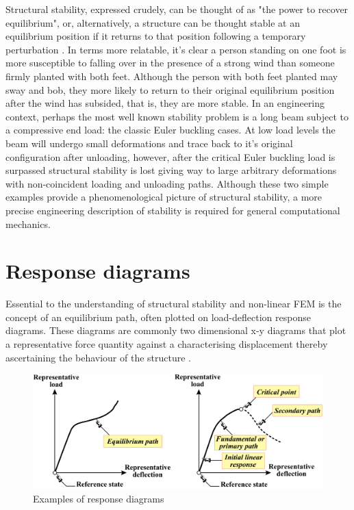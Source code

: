 Structural stability, expressed crudely, can be thought of as "the power to recover equilibrium", or, alternatively, a structure can be thought stable at an equilibrium position if it returns to that position following a temporary perturbation \cite{FelippaStabilityBasics2016}. In terms more relatable, it's clear a person standing on one foot is more susceptible to falling over in the presence of a strong wind than someone firmly planted with both feet. Although the person with both feet planted may sway and bob, they more likely to return to their original equilibrium position after the wind has subsided, that is, they are more stable. In an engineering context, perhaps the most well known stability problem is a long beam subject to a compressive end load: the classic Euler buckling cases. At low load levels the beam will undergo small deformations and trace back to it's original configuration after unloading, however, after the critical Euler buckling load is surpassed structural stability is lost giving way to large arbitrary deformations with non-coincident loading and unloading paths. Although these two simple examples provide a phenomenological picture of structural stability, a more precise engineering description of stability is required for general computational mechanics.

\section{Response diagrams}
Essential to the understanding of structural stability and non-linear FEM is the concept of an equilibrium path, often plotted on load-deflection response diagrams. These diagrams are commonly two dimensional x-y diagrams that plot a representative force quantity against a characterising displacement thereby ascertaining the behaviour of the structure \cite{FelippaNFEMTour2016}.

\begin{figure}[H]
	\centering
	\def\svgwidth{\columnwidth}
	\includegraphics[width=12cm]{images/stability_response_diagram.png}
	\caption{Examples of response diagrams \cite{FelippaNFEMTour2016}}
	\label{stab0}
\end{figure}


